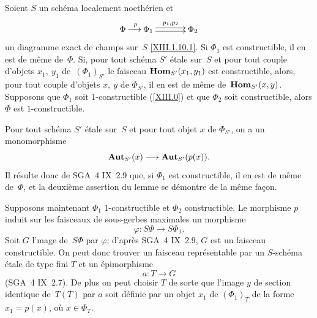 \begin{sublemme}
\label{XIII.3.1.1}
Soient $S$ un sch\'ema localement noeth\'erien et
$$
\xymatrix@C=.5cm{{\Phi}\ar[r]^p&{\Phi_1}\ar@<2pt>[rr]^{p_1,p_2}\ar@<-2pt>[rr]&&{\Phi_2}}
$$
un diagramme exact de champs sur~$S$ \eqref{XIII.1.10.1}. Si $\Phi_1$
est constructible, il en est de m\^eme de~$\Phi$. Si, pour tout
sch\'ema $S'$ \'etale sur~$S$ et pour tout couple
d'objets
$x_1,~y_1$ de~$(\Phi_1)_{S'}$ le faisceau $\operatorname{\mathbf{Hom}}_{S'}(x_1,y_1)$
est constructible, alors, pour tout couple d'objets $x,~y$ de
$\Phi_{S'}$, il en est de m\^eme de~$\operatorname{\mathbf{Hom}}_{S'}(x,y)$. Supposons
que $\Phi_1$ soit $1$-constructible (\ref{XIII.0}) et que $\Phi_2$ soit
constructible, alors $\Phi$ est $1$-constructible.
\end{sublemme}

Pour tout sch\'ema $S'$ \'etale sur~$S$ et pour tout objet $x$ de
$\Phi_{S'}$, on a un monomorphisme
$$
\SheafAut_{S'}(x)\to\SheafAut_{S'}(p(x)).
$$
Il r\'esulte donc de SGA~4 IX~2.9 que, si $\Phi_1$ est
constructible, il en est de m\^eme de~$\Phi$, et la deuxi\`eme
assertion du lemme se d\'emontre de la m\^eme fa\c con.

Supposons maintenant $\Phi_1$ $1$-constructible et $\Phi_2$
constructible. Le morphisme $p$ induit sur les faisceaux de
sous-gerbes maximales un morphisme
$$
\varphi\colon S\Phi\to S\Phi_1.
$$
Soit $G$ l'mage de~$S\Phi$ par $\varphi$; d'apr\`es SGA~4 IX~2.9,
$G$ est un faisceau constructible. On peut donc trouver un faisceau
repr\'esentable par un $S$-sch\'ema \'etale de type fini $T$ et
un \'epimorphisme
$$
a\colon T\to G
$$
(SGA~4 IX~2.7).
De plus on peut choisir $T$ de sorte que l'image $y$ de section
identique de~$T(T)$ par $a$ soit d\'efinie par un objet $x_1$ de
$(\Phi_1)_T$ de la forme $x_1=p(x)$, o\`u $x\in\Phi_T$.

